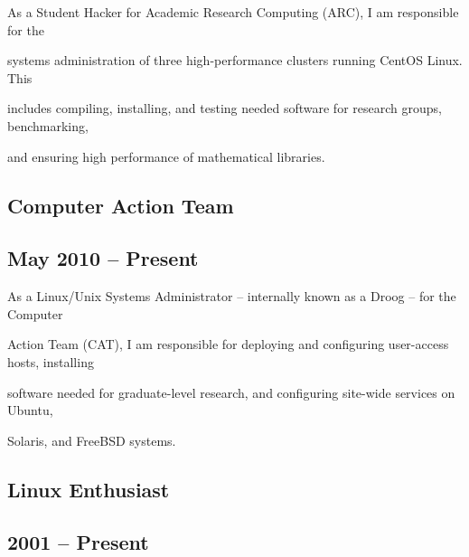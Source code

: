 \documentclass[10pt,letterpaper]{article}
\renewenvironment{itemize}{
  \begin{list}{}{
    \setlength{\leftmargin}{1.5em}
    \setlength{\itemsep}{0em}
    \setlength{\parskip}{0pt}
    \setlength{\parsep}{0em}
  }
}{
  \end{list}
}
\begin{document}
\begin{itemize}

    \item As a Student Hacker for Academic Research Computing (ARC), I am responsible for the
    \item systems administration of three high-performance clusters running CentOS Linux.  This
    \item includes compiling, installing, and testing needed software for research groups, benchmarking,
    \item and ensuring high performance of mathematical libraries.

\end{itemize}

\begin{minipage}[t]{0.5\textwidth}
	\subsection*{Computer Action Team}
\end{minipage}
\begin{minipage}[t]{0.5\textwidth}
	\subsection*{May 2010 -- Present}
\end{minipage}

\begin{itemize}

    \item As a Linux/Unix Systems Administrator -- internally known as a Droog -- for the Computer 
    \item Action Team (CAT), I am responsible for deploying and configuring user-access hosts, installing 
    \item software needed for graduate-level research, and configuring site-wide services on Ubuntu,
    \item Solaris, and FreeBSD systems.

\end{itemize}

\begin{minipage}[t]{0.5\textwidth}
	\subsection*{Linux Enthusiast}
\end{minipage}
\begin{minipage}[t]{0.5\textwidth}
	\subsection*{2001 -- Present}
\end{minipage}
\end{document}
